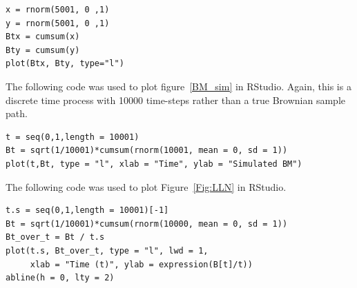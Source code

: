 \documentclass[a4paper,11pt]{article}
\theoremstyle{plain}
\theoremstyle{definition}
\begin{document}
\begin{tcolorbox}
\begin{verbatim}
x = rnorm(5001, 0 ,1)
y = rnorm(5001, 0 ,1)
Btx = cumsum(x)
Bty = cumsum(y)
plot(Btx, Bty, type="l")
\end{verbatim}
\end{tcolorbox}

The following code was used to plot figure~\ref{BM_sim} in RStudio. Again, this is a discrete time process with 10000 time-steps rather than a true Brownian sample path.

\begin{tcolorbox}
\begin{verbatim}
t = seq(0,1,length = 10001)
Bt = sqrt(1/10001)*cumsum(rnorm(10001, mean = 0, sd = 1))
plot(t,Bt, type = "l", xlab = "Time", ylab = "Simulated BM")
\end{verbatim}
\end{tcolorbox}

The following code was used to plot Figure~\ref{Fig:LLN} in RStudio.

\begin{tcolorbox}
\begin{verbatim}
t.s = seq(0,1,length = 10001)[-1]
Bt = sqrt(1/10001)*cumsum(rnorm(10000, mean = 0, sd = 1))
Bt_over_t = Bt / t.s
plot(t.s, Bt_over_t, type = "l", lwd = 1,
     xlab = "Time (t)", ylab = expression(B[t]/t))
abline(h = 0, lty = 2) 
\end{verbatim}
\end{tcolorbox}

\newpage
\renewcommand{\bibname}{References}


\end{document}
